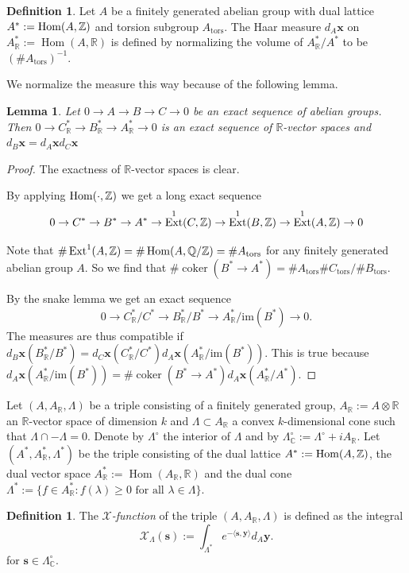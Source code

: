 \documentclass[a4paper,11pt,reqno]{amsart}
\newcommand{\Q}{\mathbb{Q}}
\newcommand{\R}{\mathbb{R}}
\newcommand{\C}{\mathbb{C}}
\DeclareMathOperator{\Hom}{Hom}
\DeclareMathOperator{\coker}{coker}
\DeclareMathOperator{\Ext}{Ext}
\newtheorem{lemma}[theorem]{Lemma}
\theoremstyle{definition}
\newtheorem{definition}[theorem]{Definition}
\begin{document}
\begin{definition}
	Let $A$ be a finitely generated abelian group with dual lattice $A^* := \Hom(A, \Z)$ and torsion subgroup $A_{\text{tors}}$. The Haar measure $d_A \mathbf{x}$ on $A_{\R}^{*} := \Hom(A, \R)$ is defined by normalizing the volume of $A^*_{\R}/ A^*$ to be $(\# A_{\text{tors}})^{-1}$.
\end{definition}
We normalize the measure this way because of the following lemma.
\begin{lemma}\label{lem:compatibility of measures on dual vector spaces in exact sequences}
	Let $0 \to A \to B \to C \to 0$ be an exact sequence of abelian groups. Then $0 \to C^*_{\R} \to B^*_{\R} \to A^*_{\R} \to 0$ is an exact sequence of $\R$-vector spaces and $d_{B} \mathbf{x} = d_{A} \mathbf{x} d_{C} \mathbf{x}$
\end{lemma}
\begin{proof}
	The exactness of $\R$-vector spaces is clear. 
	
	By applying $\Hom(\cdot, \Z)$ we get a long exact sequence 
	\[0 \to C^* \to B^* \to A^* \to \Ext^1(C, \Z) \to \Ext^1(B, \Z) \to \Ext^1(A, \Z) \to 0\]
	
	Note that $\# \Ext^{1}(A, \Z) = \# \Hom(A, \Q/\Z) = \# A_{\text{tors}}$ for any finitely generated abelian group $A$. So we find that $\# \coker(B^* \to A^*) = \# A_{\text{tors}} \# C_{\text{tors}}/\# B_{\text{tors}}$.
	
	By the snake lemma we get an exact sequence 
	\[0 \to C^*_{\R}/ C^* \to B^*_{\R}/ B^* \to A^*_{\R}/ \text{im}(B^*) \to 0.\]
	The measures are thus compatible if $d_B \mathbf{x}( B^*_{\R}/ B^*) = d_C \mathbf{x}(C^*_{\R}/ C^*) d_A \mathbf{x}(A^*_{\R}/ \text{im}(B^*))$. This is true because $d_A \mathbf{x}(A^*_{\R}/ \text{im}(B^*)) = \# \coker(B^* \to A^*) d_A \mathbf{x}(A^*_{\R}/A^*)$.
\end{proof}

Let $(A, A_{\R}, \Lambda)$ be a triple consisting of a finitely generated group, $A_{\R} := A \otimes \R$ an $\R$-vector space of dimension $k$ and $\Lambda \subset A_{\R}$ a convex $k$-dimensional cone such that $\Lambda \cap - \Lambda = 0$. Denote by $\Lambda^{\circ}$ the interior of $\Lambda$ and by $\Lambda^{\circ}_{\C} := \Lambda^{\circ} + i A_{\R}$. Let $(A^{*}, A_{\R}^*, \Lambda^*)$ be the triple consisting of the dual lattice $A^* := \Hom(A, \Z)$, the dual vector space $A^*_{\R} := \Hom(A_{\R}, \R)$ and the dual cone $\Lambda^* := \{f \in A^*_{\R} : f(\lambda) \geq 0 \text{ for all } \lambda \in \Lambda\}$.
\begin{definition}
	The \emph{$\mathcal{X}$-function} of the triple $(A, A_{\R}, \Lambda)$ is defined as the integral 
	\begin{equation*}
		\mathcal{X}_{\Lambda}(\bm{s}) := \int_{\Lambda^*} e^{- \langle \bm{s}, \mathbf{y} \rangle} d_{A}\mathbf{y}.
	\end{equation*}
	for $\bm{s} \in \Lambda_{\C}^{\circ}$.
\end{definition}
\end{document}

